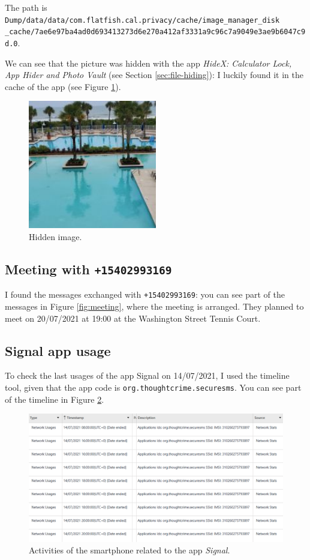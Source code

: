 \documentclass[12pt]{article}
\begin{document}
The path is \texttt{Dump/data/data/com.flatfish.cal.privacy/cache/image\_manager\_disk \\ \_cache/7ae6e97ba4ad0d693413273d6e270a412af3331a9c96c7a9049e3ae9b6047c9d.0}.

We can see that the picture was hidden with the app \textit{HideX: Calculator Lock, App Hider and Photo Vault} (see Section \ref{sec:file-hiding}): I luckily found it in the cache of the app (see Figure \ref{fig:cache}).

\begin{figure}[!ht]
    \centering
    \includegraphics[width=0.5\textwidth]{images/hidden.png}
    \caption{Hidden image.}
    \label{fig:cache}
\end{figure}

\subsection{Meeting with \texttt{+15402993169}}

I found the messages exchanged with \texttt{+15402993169}: you can see part of the messages in Figure \ref{fig:meeting}, where the meeting is arranged. They planned to meet on 20/07/2021 at 19:00 at the Washington Street Tennis Court.

\subsection{Signal app usage}

To check the last usages of the app Signal \cite{signal} on 14/07/2021, I used the timeline tool, given that the app code is \texttt{org.thoughtcrime.securesms}.
You can see part of the timeline in Figure \ref{fig:signal}.

\begin{figure}[!ht]
    \centering
    \includegraphics[width=\textwidth]{images/signal.png}
    \caption{Activities of the smartphone related to the app \textit{Signal}.}
    \label{fig:signal}
\end{figure}

\printbibliography[title={References}]
\end{document}

